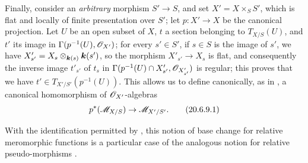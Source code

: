 \begin{env}[20.6.9]
\label{IV.20.6.9}
Finally, consider an \emph{arbitrary} morphism $S'\to S$, and set $X'=X\times_S S'$, which is flat and locally of finite presentation over $S'$; let $p:X'\to X$ be the canonical projection.
Let $U$ be an open subset of $X$, $t$ a section belonging to $T_{X/S}(U)$, and $t'$ its image in $\Gamma(p^{-1}(U),\mathscr{O}_{X'})$; for every $s'\in S'$, if $s\in S$ is the image of $s'$, we have $X'_{s'}=X_s\otimes_{\boldsymbol{k}(s)}\boldsymbol{k}(s')$, so the morphism $X'_{s'}\to X_s$ is flat, and consequently  the inverse image $t'_{s'}$ of $t_s$ in $\Gamma(p^{-1}(U)\cap X'_{s'},\mathscr{O}_{X'_{s'}})$ is regular; this proves that we have $t'\in T_{X'/S'}(p^{-1}(U))$.
This allows us to define canonically, as in , a canonical homomorphism of $\mathscr{O}_{X'}$-algebras
\[
\label{IV.20.6.9.1}
  p^*(\mathscr{M}_{X/S})\to\mathscr{M}_{X'/S'}.
  \tag{20.6.9.1}
\]

With the identification permitted by , this notion of base change for relative meromorphic functions is a particular case of the analogous notion for relative pseudo-morphisms .
\end{env}
